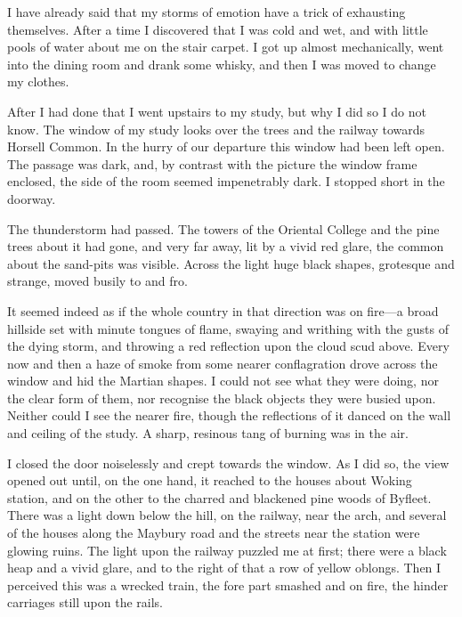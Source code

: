 

\lettrine[lines=4]{I}{} have already said that my storms of emotion have a trick of exhausting themselves. After a time I discovered that I was cold and wet, and with little pools of water about me on the stair carpet. I got up almost mechanically, went into the dining room and drank some whisky, and then I was moved to change my clothes.

After I had done that I went upstairs to my study, but why I did so I do not know. The window of my study looks over the trees and the railway towards Horsell Common. In the hurry of our departure this window had been left open. The passage was dark, and, by contrast with the picture the window frame enclosed, the side of the room seemed impenetrably dark. I stopped short in the doorway.

The thunderstorm had passed. The towers of the Oriental College and the pine trees about it had gone, and very far away, lit by a vivid red glare, the common about the sand-pits was visible. Across the light huge black shapes, grotesque and strange, moved busily to and fro.

It seemed indeed as if the whole country in that direction was on fire—a broad hillside set with minute tongues of flame, swaying and writhing with the gusts of the dying storm, and throwing a red reflection upon the cloud scud above. Every now and then a haze of smoke from some nearer conflagration drove across the window and hid the Martian shapes. I could not see what they were doing, nor the clear form of them, nor recognise the black objects they were busied upon. Neither could I see the nearer fire, though the reflections of it danced on the wall and ceiling of the study. A sharp, resinous tang of burning was in the air.

I closed the door noiselessly and crept towards the window. As I did so, the view opened out until, on the one hand, it reached to the houses about Woking station, and on the other to the charred and blackened pine woods of Byfleet. There was a light down below the hill, on the railway, near the arch, and several of the houses along the Maybury road and the streets near the station were glowing ruins. The light upon the railway puzzled me at first; there were a black heap and a vivid glare, and to the right of that a row of yellow oblongs. Then I perceived this was a wrecked train, the fore part smashed and on fire, the hinder carriages still upon the rails.

